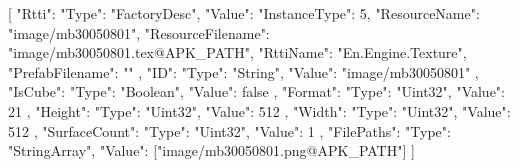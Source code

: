 [{
        "Rtti": {
            "Type": "FactoryDesc",
            "Value": {
                "InstanceType": 5,
                "ResourceName": "image/mb30050801",
                "ResourceFilename": "image/mb30050801.tex@APK_PATH",
                "RttiName": "En.Engine.Texture",
                "PrefabFilename": ""
            }
        },
        "ID": {
            "Type": "String",
            "Value": "image/mb30050801"
        },
        "IsCube": {
            "Type": "Boolean",
            "Value": false
        },
        "Format": {
            "Type": "Uint32",
            "Value": 21
        },
        "Height": {
            "Type": "Uint32",
            "Value": 512
        },
        "Width": {
            "Type": "Uint32",
            "Value": 512
        },
        "SurfaceCount": {
            "Type": "Uint32",
            "Value": 1
        },
        "FilePaths": {
            "Type": "StringArray",
            "Value": ["image/mb30050801.png@APK_PATH"]
        }
    }]